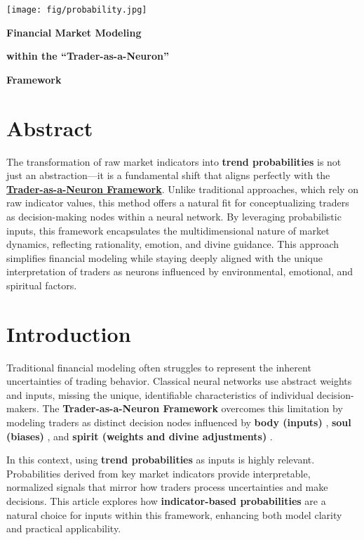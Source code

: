 \documentclass[a4]{article}
\newcommand{\bn}{\bigskip\noindent}
\newcommand{\mn}{\medskip\noindent}
\begin{document}
\begin{center}
\texttt{[image: fig/probability.jpg]}
\end{center}

\mn
{\huge\bf Financial Market Modeling}

\mn
{\huge\bf within the ``Trader-as-a-Neuron''}

\bn
{\huge\bf Framework }

\bn
\section*{Abstract}

The transformation of raw market indicators into {\bf trend probabilities}  is not just an abstraction---it is a fundamental shift that aligns perfectly with the
\href{https://blog.quantiota.ai/page/9/the-governing-equation-of-financial-markets-a-unified-framework/} {\bf Trader-as-a-Neuron Framework}. Unlike traditional approaches, which rely on raw indicator values, this method offers a natural fit for conceptualizing traders as decision-making nodes within a neural network. By leveraging probabilistic inputs, this framework encapsulates the multidimensional nature of market dynamics, reflecting rationality, emotion, and divine guidance. This approach simplifies financial modeling while staying deeply aligned with the unique interpretation of traders as neurons influenced by environmental, emotional, and spiritual factors.


\bn
\section{Introduction}

Traditional financial modeling often struggles to represent the inherent uncertainties of trading behavior. Classical neural networks use abstract weights and inputs, missing the unique, identifiable characteristics of individual decision-makers. The {\bf Trader-as-a-Neuron Framework}  overcomes this limitation by modeling traders as distinct decision nodes influenced by {\bf body (inputs)} , {\bf soul (biases)} , and {\bf spirit (weights and divine adjustments)} .

\bn
In this context, using {\bf trend probabilities}  as inputs is highly relevant. Probabilities derived from key market indicators provide interpretable, normalized signals that mirror how traders process uncertainties and make decisions. This article explores how {\bf indicator-based probabilities}  are a natural choice for inputs within this framework, enhancing both model clarity and practical applicability.
\end{document}
